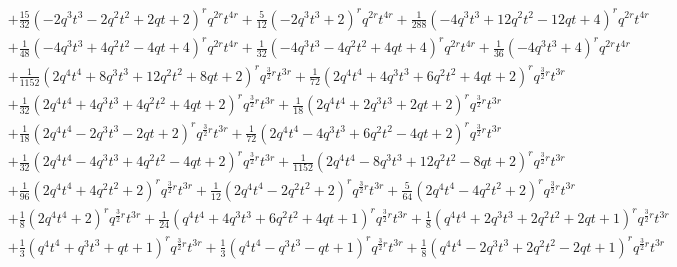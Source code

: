 \documentclass[11pt,english]{amsart}
\numberwithin{equation}{section}
\numberwithin{figure}{section}
\theoremstyle{plain}
\theoremstyle{plain}
\theoremstyle{definition}
\theoremstyle{remark}
\begin{document}
{\begin{align*}
& + \frac{15}{32} {\left(-2 q^{3} t^{3} - 2 q^{2} t^{2} + 2 q t + 2\right)}^{r} q^{2r} t^{4r} + \frac{5}{12} {\left(-2 q^{3} t^{3} + 2\right)}^{r} q^{2r} t^{4r} + \frac{1}{288} {\left(-4 q^{3} t^{3} + 12 q^{2} t^{2} - 12 q t + 4\right)}^{r} q^{2r} t^{4r} \\
& + \frac{1}{48} {\left(-4 q^{3} t^{3} + 4 q^{2} t^{2} - 4 q t + 4\right)}^{r} q^{2r} t^{4r} + \frac{1}{32} {\left(-4 q^{3} t^{3} - 4 q^{2} t^{2} + 4 q t + 4\right)}^{r} q^{2r} t^{4r} + \frac{1}{36} {\left(-4 q^{3} t^{3} + 4\right)}^{r} q^{2r} t^{4r} \\
& + \frac{1}{1152} {\left(2 q^{4} t^{4} + 8 q^{3} t^{3} + 12 q^{2} t^{2} + 8 q t + 2\right)}^{r} q^{\frac{3}{2} r}t^{3r} + \frac{1}{72} {\left(2 q^{4} t^{4} + 4 q^{3} t^{3} + 6 q^{2} t^{2} + 4 q t + 2\right)}^{r} q^{\frac{3}{2} r}t^{3r} \\
& + \frac{1}{32} {\left(2 q^{4} t^{4} + 4 q^{3} t^{3} + 4 q^{2} t^{2} + 4 q t + 2\right)}^{r} q^{\frac{3}{2} r}t^{3r} + \frac{1}{18} {\left(2 q^{4} t^{4} + 2 q^{3} t^{3} + 2 q t + 2\right)}^{r} q^{\frac{3}{2} r}t^{3r} \\
& + \frac{1}{18} {\left(2 q^{4} t^{4} - 2 q^{3} t^{3} - 2 q t + 2\right)}^{r} q^{\frac{3}{2} r}t^{3r} + \frac{1}{72} {\left(2 q^{4} t^{4} - 4 q^{3} t^{3} + 6 q^{2} t^{2} - 4 q t + 2\right)}^{r} q^{\frac{3}{2} r}t^{3r} \\
& + \frac{1}{32} {\left(2 q^{4} t^{4} - 4 q^{3} t^{3} + 4 q^{2} t^{2} - 4 q t + 2\right)}^{r} q^{\frac{3}{2} r}t^{3r} + \frac{1}{1152} {\left(2 q^{4} t^{4} - 8 q^{3} t^{3} + 12 q^{2} t^{2} - 8 q t + 2\right)}^{r} q^{\frac{3}{2} r}t^{3r} \\
& + \frac{1}{96} {\left(2 q^{4} t^{4} + 4 q^{2} t^{2} + 2\right)}^{r} q^{\frac{3}{2} r}t^{3r} + \frac{1}{12} {\left(2 q^{4} t^{4} - 2 q^{2} t^{2} + 2\right)}^{r} q^{\frac{3}{2} r}t^{3r} + \frac{5}{64} {\left(2 q^{4} t^{4} - 4 q^{2} t^{2} + 2\right)}^{r} q^{\frac{3}{2} r}t^{3r} \\
& + \frac{1}{8} {\left(2 q^{4} t^{4} + 2\right)}^{r} q^{\frac{3}{2} r}t^{3r} + \frac{1}{24} {\left(q^{4} t^{4} + 4 q^{3} t^{3} + 6 q^{2} t^{2} + 4 q t + 1\right)}^{r} q^{\frac{3}{2} r}t^{3r} + \frac{1}{8} {\left(q^{4} t^{4} + 2 q^{3} t^{3} + 2 q^{2} t^{2} + 2 q t + 1\right)}^{r} q^{\frac{3}{2} r}t^{3r} \\
& + \frac{1}{3} {\left(q^{4} t^{4} + q^{3} t^{3} + q t + 1\right)}^{r} q^{\frac{3}{2} r}t^{3r} + \frac{1}{3} {\left(q^{4} t^{4} - q^{3} t^{3} - q t + 1\right)}^{r} q^{\frac{3}{2} r}t^{3r} + \frac{1}{8} {\left(q^{4} t^{4} - 2 q^{3} t^{3} + 2 q^{2} t^{2} - 2 q t + 1\right)}^{r} q^{\frac{3}{2} r}t^{3r} \\

\end{align*}}
\end{document}
